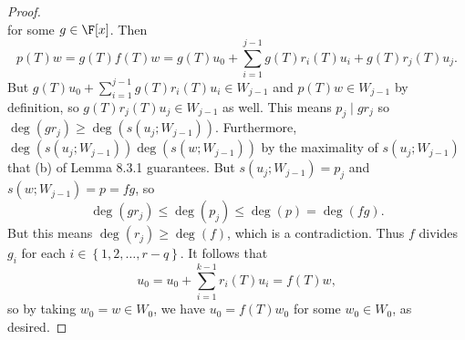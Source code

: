 \documentclass[linearalgebra]{subfiles}
\begin{document}
\begin{proof}
\begin{equation*}
        \end{equation*}
        for some $g\in\F[x]$. Then
        \begin{equation*}
            p(T)w = g(T)f(T)w = g(T)u_0 + \sum^{j-1}_{i=1} g(T)r_i(T)u_i + g(T)r_j(T)u_j.
        \end{equation*}
        But $g(T)u_0+\sum^{j-1}_{i=1} g(T)r_i(T)u_i\in W_{j-1}$ and $p(T)w\in W_{j-1}$ by definition, so $g(T)r_j(T)u_j\in W_{j-1}$ as well. This means $p_j\mid gr_j$ so $\deg\left( gr_j \right) \geq \deg\left( s\left( u_j;W_{j-1} \right) \right)$. Furthermore, $\deg\left( s\left( u_j;W_{j-1} \right)  \right) \deg\left( s\left( w;W_{j-1} \right)  \right)$ by the maximality of $s\left( u_j;W_{j-1} \right) $ that (b) of Lemma 8.3.1 guarantees. But $s\left( u_j;W_{j-1} \right) = p_j$ and $s\left( w;W_{j-1} \right) = p = fg$, so
        \begin{equation*}
            \deg\left( gr_j \right) \leq \deg\left( p_j \right) \leq \deg(p) = \deg(fg).
        \end{equation*}
        But this means $\deg\left( r_j \right) \geq \deg(f)$, which is a contradiction. Thus $f$ divides $g_i$ for each $i\in\left\lbrace 1,2,\ldots,r-q \right\rbrace $. It follows that
        \begin{equation*}
            u_0 = u_0 + \sum^{k-1}_{i=1} r_i(T)u_i = f(T)w,
        \end{equation*}
        so by taking $w_0=w\in W_0$, we have $u_0 = f(T)w_0$ for some $w_0\in W_0$, as desired.
    \end{proof}

\end{document}
